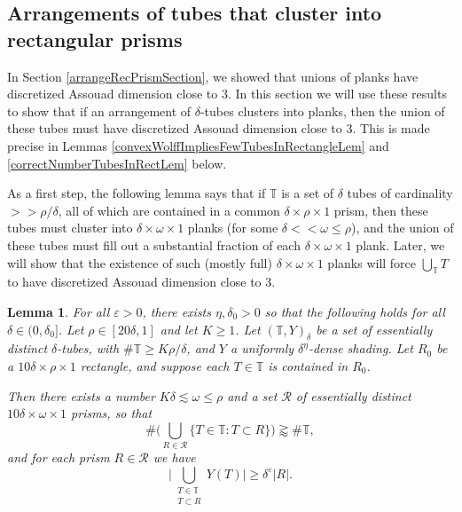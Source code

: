 \documentclass[letterpaper, reqno,11pt]{article}
\numberwithin{equation}{section}
\newcommand{\eps}{\varepsilon}
\newcommand{\tubes}{\mathbb{T}}
\numberwithin{thm}{section}
\newtheorem{lem}[thm]{Lemma}
\theoremstyle{remark}
\begin{document}

\subsection{Arrangements of tubes that cluster into rectangular prisms}
In Section \ref{arrangeRecPrismSection}, we showed that unions of planks have discretized Assouad dimension close to 3. In this section we will use these results to show that if an arrangement of $\delta$-tubes clusters into planks, then the union of these tubes must have discretized Assouad dimension close to 3. This is made precise in Lemmas \ref{convexWolffImpliesFewTubesInRectangleLem} and \ref{correctNumberTubesInRectLem} below. 

As a first step, the following lemma says that if $\tubes$ is a set of $\delta$ tubes of cardinality $>\!\!>\rho/\delta$, all of which are contained in a common $\delta\times\rho\times 1$ prism, then these tubes must cluster into $\delta\times\omega\times1$ planks (for some $\delta<\!\!<\omega\leq\rho$), and the union of these tubes must fill out a substantial fraction of each $\delta\times\omega\times 1$ plank. Later, we will show that the existence of such (mostly full) $\delta\times\omega\times 1$ planks will force $\bigcup_{\tubes}T$ to have discretized Assouad dimension close to 3. 

\begin{lem}\label{heavyRectangleYieldsFullRectangleLem}
For all $\eps>0$, there exists $\eta,\delta_0>0$ so that the following holds for all $\delta\in(0,\delta_0]$. Let $\rho\in[20\delta,1]$ and let $K\geq 1$. Let $(\tubes,Y)_\delta$ be a set of essentially distinct $\delta$-tubes, with $\#\tubes\geq K\rho/\delta$, and $Y$ a uniformly $\delta^\eta$-dense shading. Let $R_0$ be a $10\delta\times \rho \times 1$ rectangle, and suppose each $T\in\tubes$ is contained in $R_0$. 

Then there exists a number $K\delta\lesssim \omega\leq\rho$ and a set $\mathcal{R}$ of essentially distinct $10\delta\times\omega\times 1$ prisms, so that 
\begin{equation}\label{mostTubesInAPrism}
\#\Big(\bigcup_{R\in\mathcal{R}}\{T\in\tubes\colon T\subset R\}\Big)\gtrapprox\#\tubes,
\end{equation}
and for each prism $R\in\mathcal{R}$ we have
\begin{equation}\label{prismFull}
\Big|\bigcup_{\substack{T\in\tubes \\ T\subset R}}Y(T)\Big|\geq\delta^\eps|R|.
\end{equation}
\end{lem}
\end{document}
